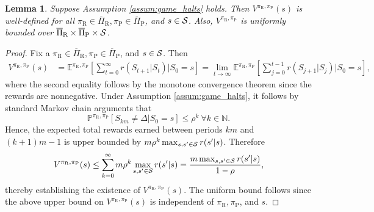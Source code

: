 \documentclass[11pt]{article}
\newtheorem{lemma}{Lemma}
\begin{document}
       \begin{lemma}
           \label{lem:sg_pol_val_well_defined}
           Suppose Assumption \ref{assum:game_halts} holds. Then $V^{\pi_\text{R},\pi_\text{P}}(s)$ is well-defined for all $\pi_\text{R} \in \overline\Pi_\text{R}, \pi_\text{P} \in \overline\Pi_\text{P}$, and $s \in {\cal S}$. Also, $V^{\pi_\text{R},\pi_\text{P}}$ is uniformly bounded over $\overline\Pi_\text{R} \times \overline\Pi_\text{P} \times {\cal S}$.  
       \end{lemma}
       \begin{proof}
           Fix a $\pi_\text{R} \in \overline\Pi_\text{R}, \pi_\text{P} \in \overline\Pi_\text{P}$, and $s \in {\cal S}$. Then 
           \begingroup
           \allowdisplaybreaks
           \begin{align*}
               V^{\pi_\text{R},\pi_\text{P}}(s) &= \mathbb{E}^{\pi_\text{R},\pi_\text{P}}\left[\sum_{t=0}^\infty r(S_{t+1}|S_t) \Big| S_0 = s\right] = \lim_{t \to \infty} \mathbb{E}^{\pi_\text{R},\pi_\text{P}}\left[\sum_{j=0}^{t-1} r(S_{j+1}|S_j) \Big| S_0 = s\right],
           \end{align*}
           \endgroup
           where the second equality follows by the monotone convergence theorem since the rewards are nonnegative. Under Assumption \ref{assum:game_halts}, it follows by standard Markov chain arguments that
           \[
           \mathbb{P}^{\pi_\text{R}, \pi_\text{P}}[S_{km} \neq \Delta|S_0=s] \leq \rho^k \ \forall k \in \mathbb{N}.
           \]
           Hence, the expected total rewards earned between periods $km$ and $(k+1)m - 1$ is upper bounded by $m\rho^k \max_{s,s' \in {\cal S}}r(s'|s)$. Therefore
           \[
           V^{\pi_\text{R},\pi_\text{P}}(s) \leq \sum_{k=0}^\infty m\rho^k \max_{s,s' \in {\cal S}}r(s'|s) = \frac{m \max_{s,s' \in {\cal S}}r(s'|s)}{1-\rho},
           \]
           thereby establishing the existence of $V^{\pi_\text{R},\pi_\text{P}}(s)$. The uniform bound follows since the above upper bound on $V^{\pi_\text{R},\pi_\text{P}}(s)$ is independent of $\pi_\text{R},\pi_\text{P}$, and $s$.
       \end{proof}
       
\end{document}
